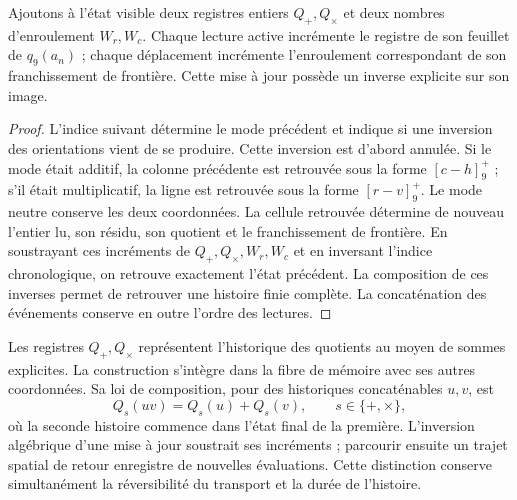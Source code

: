 \begin{proposition}
\label{ii:electron-inversa-cocientes}
Ajoutons à l'état visible deux registres entiers \(Q_+,Q_\times\)
et deux nombres d'enroulement \(W_r,W_c\). Chaque lecture active
incrémente le registre de son feuillet de \(q_9(a_n)\) ; chaque déplacement
incrémente l'enroulement correspondant de son franchissement de frontière.
Cette mise à jour possède un inverse explicite sur son image.
\end{proposition}
\begin{proof}
L'indice suivant détermine le mode précédent et indique si une inversion
des orientations vient de se produire. Cette inversion est d'abord annulée.
Si le mode était additif, la colonne précédente est retrouvée sous la forme
\([c-h]^+_9\) ; s'il était multiplicatif, la ligne est retrouvée sous la forme
\([r-v]^+_9\). Le mode neutre conserve les deux coordonnées. La cellule
retrouvée détermine de nouveau l'entier lu, son résidu, son
quotient et le franchissement de frontière. En soustrayant ces incréments de
\(Q_+,Q_\times,W_r,W_c\) et en inversant l'indice chronologique, on
retrouve exactement l'état précédent. La composition de ces
inverses permet de retrouver une histoire finie complète. La concaténation des
événements conserve en outre l'ordre des lectures.
\end{proof}

Les registres \(Q_+,Q_\times\) représentent l'historique des quotients au moyen de sommes explicites. La construction s'intègre dans la fibre de mémoire avec ses autres coordonnées. Sa loi de composition, pour des historiques concaténables \(u,v\), est
\[
 Q_s(uv)=Q_s(u)+Q_s(v),\qquad s\in\{+,\times\},
\]
où la seconde histoire commence dans l'état final de la première.
L'inversion algébrique d'une mise à jour soustrait ses incréments ;
parcourir ensuite un trajet spatial de retour enregistre
de nouvelles évaluations. Cette distinction conserve simultanément la
réversibilité du transport et la durée de l'histoire.

